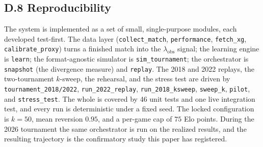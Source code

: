 \documentclass[11pt,letterpaper]{article}
\begin{document}
\subsection*{D.8 \quad Reproducibility}

The system is implemented as a set of small, single-purpose modules, each developed test-first. The data layer (\texttt{collect\_match}, \texttt{performance}, \texttt{fetch\_xg}, \texttt{calibrate\_proxy}) turns a finished match into the $\lambda_{\text{obs}}$ signal; the learning engine is \texttt{learn}; the format-agnostic simulator is \texttt{sim\_tournament}; the orchestrator is \texttt{snapshot} (the divergence measure) and \texttt{replay}. The 2018 and 2022 replays, the two-tournament $k$-sweep, the rehearsal, and the stress test are driven by \texttt{tournament\_2018/2022}, \texttt{run\_2022\_replay}, \texttt{run\_2018\_ksweep}, \texttt{sweep\_k}, \texttt{pilot}, and \texttt{stress\_test}. The whole is covered by 46 unit tests and one live integration test, and every run is deterministic under a fixed seed. The locked configuration is $k=50$, mean reversion $0.95$, and a per-game cap of $75$ Elo points. During the 2026 tournament the same orchestrator is run on the realized results, and the resulting trajectory is the confirmatory study this paper has registered.
\end{document}
